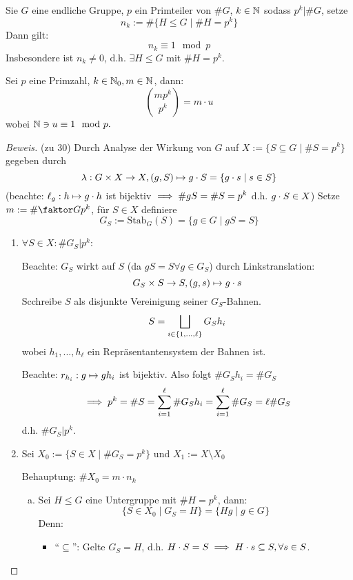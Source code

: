 \documentclass[a4paper]{report}
\begin{document}
\begin{satz}
  Sie $G$ eine endliche Gruppe, $p$ ein Primteiler von $\#G$, $k \in \mathbb{N}$ sodass $p^{k} | \#G$, setze
  \[n_{k}:= \#\{H \le G \mid \#H = p^{k}\}\]
  Dann gilt:
  \[n_{k} \equiv 1 \mod p\]
  Insbesondere ist $n_{k} \ne 0$, d.h. $\exists H \le G$ mit $\#H = p^{k}$.
\end{satz}
\begin{ubng*}[Vorbereitung]
  Sei $p$ eine Primzahl, $k \in \mathbb{N}_0, m \in \mathbb{N}$, dann:
  \[\binom {mp^{k}}{p^{k}} = m \cdot u\]
  wobei $\mathbb{N} \ni u \equiv 1 \mod p.$
\end{ubng*}
\begin{proof}[Beweis](zu 30)
  Durch Analyse der Wirkung von $G$ auf $X:= \{S \subseteq G \mid \#S=p^{k}\}$
  gegeben durch
  \[\lambda: G \times X \to X, (g, S) \mapsto g \cdot S = \{g \cdot s \mid s \in S\}\]
  (beachte: $\ell_{g} : h \mapsto g \cdot h$ ist bijektiv $\implies \#gS = \#S = p^{k}$ d.h. $g \cdot S  \in X$)
  Setze $m:= \# \fak G{p^{k}}$, für $S \in X$ definiere
  \[G_{S} := \mathrm{Stab}_{G}(S) = \{g \in G \mid gS = S\}\]
\begin{enumerate}
  \item $\forall S \in X : \#G_{S} | p^{k}$:

        Beachte: $G_{S}$ wirkt auf $S$ (da $gS = S \forall g \in G_{S}$) durch Linkstranslation:\[G_{S} \times S \to S, (g, s) \mapsto g \cdot s\]
        Scchreibe $S$ als disjunkte Vereinigung seiner $G_{S}$-Bahnen.
        \[S = \bigsqcup_{i \in \{1, \ldots, \ell\}} G_{S}h_{i}\]
        wobei $h_{1}, ..., h_{\ell}$ ein Repräsentantensystem der Bahnen ist.

        Beachte: $r_{h_{i}}: g \mapsto gh_{i}$ ist bijektiv.
        Also folgt $\#G_{S}h_{i} = \#G_{S}$
        \[\implies p^{k} = \#S = \sum_{i=1}^{\ell} \#G_{S}h_{i} = \sum_{i=1}^{\ell} \#G_{S} = \ell \#G_{S}\]
        d.h. $\#G_{S} | p^{k}$.
  \item Sei $X_{0}:= \{S \in X \mid \#G_{S} = p^{k}\}$ und $X_{1}:= X \setminus X_{0}$

        Behauptung: $\#X_{0} = m \cdot n_{k}$
        \begin{enumerate}[(a)]
          \item Sei $H \le G$ eine Untergruppe mit $\#H = p^{k}$, dann:
                \[\{S \in X_{0} \mid G_{S} = H\} = \{Hg \mid g \in G\}\]
                Denn:
                \begin{itemize}
                  \item ``$\subseteq$'': Gelte $G_{S} = H$, d.h. $H \cdot S = S \implies H\cdot s \subseteq S, \forall s \in S$.


\end{itemize}
\end{enumerate}
\end{enumerate}
\end{proof}
\end{document}

